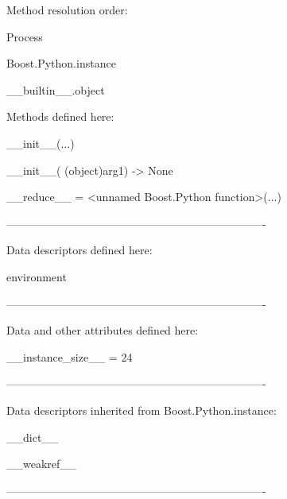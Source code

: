 \documentclass[letterpaper,10pt,english]{sphinxmanual}
\begin{document}
\begin{description}
\begin{description}
\item[{class Process(Boost.Python.instance)}] \leavevmode
\begin{DUlineblock}{0em}
\item[] Method resolution order:
\item[]
\begin{DUlineblock}{\DUlineblockindent}
\item[] Process
\item[] Boost.Python.instance
\item[] \_\_builtin\_\_.object
\item[] 
\end{DUlineblock}
\item[] Methods defined here:
\item[] 
\item[] \_\_init\_\_(...)
\item[]
\begin{DUlineblock}{\DUlineblockindent}
\item[] \_\_init\_\_( (object)arg1) -\textgreater{} None
\item[] 
\end{DUlineblock}
\item[] \_\_reduce\_\_ = \textless{}unnamed Boost.Python function\textgreater{}(...)
\item[] 
\item[] ----------------------------------------------------------------------
\item[] Data descriptors defined here:
\item[] 
\item[] environment
\item[] 
\item[] ----------------------------------------------------------------------
\item[] Data and other attributes defined here:
\item[] 
\item[] \_\_instance\_size\_\_ = 24
\item[] 
\item[] ----------------------------------------------------------------------
\item[] Data descriptors inherited from Boost.Python.instance:
\item[] 
\item[] \_\_dict\_\_
\item[] 
\item[] \_\_weakref\_\_
\item[] 
\item[] ----------------------------------------------------------------------

\end{DUlineblock}
\end{description}
\end{description}
\end{document}
